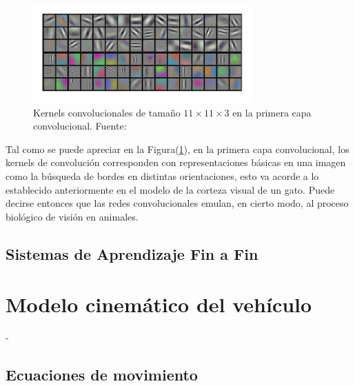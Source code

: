         \begin{figure}[!h] 
            \centering
            \includegraphics[width=0.75\textwidth]{img/fmap_imagenet}
            \caption{Kernels convolucionales de tamaño $11 \times 11 \times 3$ en la primera capa convolucional. Fuente: \cite{krizhevsky2012imagenet} }
            \label{fig:fmap_imagenet}
        \end{figure}
            
        Tal como se puede apreciar en la Figura(\ref{fig:fmap_imagenet}), en la primera capa convolucional, 
        los kernels de convolución corresponden con representaciones básicas en una imagen como la búsqueda de 
        bordes en distintas orientaciones, esto va acorde a lo establecido anteriormente en el modelo de 
        la corteza visual de un gato. Puede decirse entonces que las redes convolucionales emulan, en cierto modo, 
        al proceso biológico de visión en animales.

    \subsection{Sistemas de Aprendizaje Fin a Fin}

\section{Modelo cinemático del vehículo}
-
    \subsection{Ecuaciones de movimiento}


